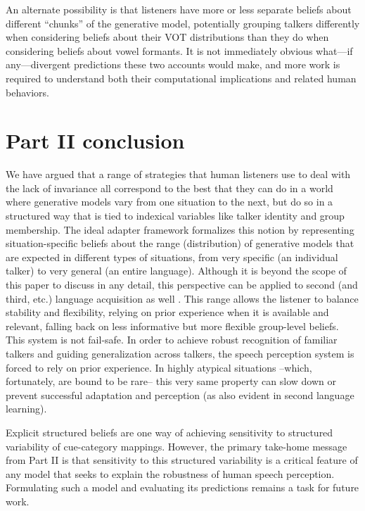 An alternate possibility is that listeners have more or less separate beliefs about different ``chunks'' of the generative model, potentially grouping talkers differently when considering beliefs about their VOT distributions than they do when considering beliefs about vowel formants.  It is not immediately obvious what---if any---divergent predictions these two accounts would make, and more work is required to understand both their computational implications and related human behaviors.

\label{r1-cluster-questions-end}

\section{Part II conclusion}
\label{sec:part-ii-conclusion}

We have argued that a range of strategies that human listeners use to deal with the lack of invariance all correspond to the best that they can do in a world where generative models vary from one situation to the next, but do so in a structured way that is tied to indexical variables like talker identity and group membership.  The ideal adapter framework formalizes this notion by representing situation-specific beliefs about the range (distribution) of generative models that are expected in different types of situations, from very specific (an individual talker) to very general (an entire language).%
Although it is beyond the scope of this paper to discuss in any detail, this perspective can be applied to second (and third, etc.) language acquisition as well \autocite{Pajak2016}.
This range allows the listener to balance stability and flexibility, relying on prior experience when it is available and relevant, falling back on less informative but more flexible group-level beliefs. This system is not fail-safe. In order to achieve robust recognition of familiar talkers and guiding generalization across talkers, the speech perception system is forced to rely on prior experience. In highly atypical situations --which, fortunately, are bound to be rare-- this very same property can slow down or prevent successful adaptation and perception (as also evident in second language learning). 

Explicit structured beliefs are one way of achieving sensitivity to structured variability of cue-category mappings. However, the primary take-home message from Part II is that sensitivity to this structured variability is a critical feature of any model that seeks to explain the robustness of human speech perception.  Formulating such a model and evaluating its predictions remains a task for future work.


